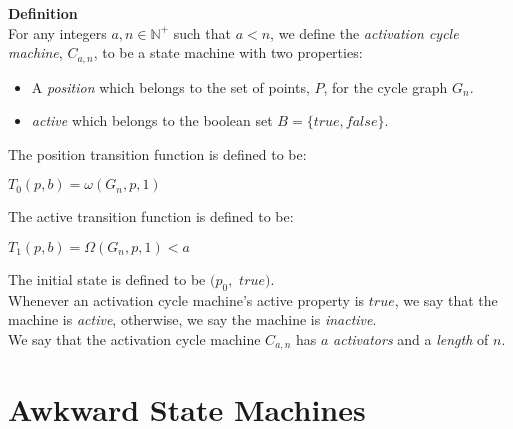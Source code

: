 \documentclass[a4paper,12pt]{article}
\begin{document}
\label{definition:activation_cycle_machine}
\hypertarget{definition:activation_cycle_machine}{}
\begin{tcolorbox}
\textbf{Definition}\\
For any integers $a, n \in \mathbb{N^+}$ such that $a < n$, we define the \textit{activation cycle machine}, $C_{a, n}$, to be a state machine with two properties:

\begin{itemize}
\item A \textit{position} which belongs to the set of points, $P$, for the cycle graph $G_n$.

\item \textit{active} which belongs to the boolean set $B = \{true, false\}$.
\end{itemize}

The position transition function is defined to be:
\begin{center}
$T_0(p, b) = \omega(G_n, p, 1)$
\end{center}

The active transition function is defined to be:
\begin{center}
$T_1(p, b) = \Omega(G_n, p, 1) < a$ 
\end{center}

The initial state is defined to be $(p_0,$ $true)$.\\

\noindent Whenever an activation cycle machine's active property is $true$, we say that the machine is \textit{active}, otherwise, we say the machine is \textit{inactive}.\\

\noindent We say that the activation cycle machine $C_{a, n}$ has $a$ \textit{activators} and a \textit{length} of $n$.

\end{tcolorbox}




















\section{Awkward State Machines}
\label{section:awkward_state_machines}
\hypertarget{section:awkward_state_machines}{}
\end{document}
